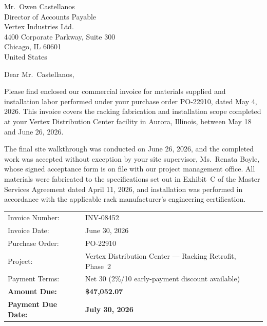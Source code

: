 \documentclass[11pt,a4paper,addressstd]{dinbrief}
\begin{document}
\begin{letter}{Mr.\ Owen Castellanos\\
               Director of Accounts Payable\\
               Vertex Industries Ltd.\\
               4400 Corporate Parkway, Suite 300\\
               Chicago, IL 60601\\
               United States}


\date{July 1, 2026}
\writer{}
\subject{Commercial Invoice INV-08452 --- Vertex Distribution Center Racking Retrofit, Phase 2}

\opening{Dear Mr.\ Castellanos,}

Please find enclosed our commercial invoice for materials supplied and installation
labor performed under your purchase order PO-22910, dated May 4, 2026. This invoice
covers the racking fabrication and installation scope completed at your Vertex
Distribution Center facility in Aurora, Illinois, between May 18 and June 26, 2026.

The final site walkthrough was conducted on June 26, 2026, and the completed work
was accepted without exception by your site supervisor, Ms.\ Renata Boyle, whose
signed acceptance form is on file with our project management office. All materials
were fabricated to the specifications set out in Exhibit~C of the Master Services
Agreement dated April 11, 2026, and installation was performed in accordance with
the applicable rack manufacturer's engineering certification.

\begin{tcolorbox}[
  colback=paleSteel,
  colframe=meridianNavy,
  boxrule=0.8pt,
  arc=1.5mm,
  left=4mm,right=4mm,top=2.5mm,bottom=2.5mm,
  colbacktitle=meridianNavy,
  coltitle=white,
  fonttitle=\sffamily\bfseries,
  title=Invoice Summary
]
\begin{tabular}{@{}lp{8.6cm}@{}}
Invoice Number: & INV-08452\\
Invoice Date: & June 30, 2026\\
Purchase Order: & PO-22910\\
Project: & Vertex Distribution Center --- Racking Retrofit, Phase~2\\
Payment Terms: & Net 30 (2\%/10 early-payment discount available)\\
\textbf{Amount Due:} & \textbf{\color{meridianGold}\$47,052.07}\\
\textbf{Payment Due Date:} & \textbf{July 30, 2026}\\
\end{tabular}
\end{tcolorbox}


\end{letter}
\end{document}
